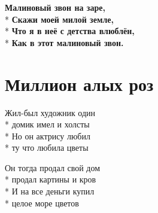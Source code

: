 \medskip

\begin{minipage}{\linewidth}
\hspace*{1.5em}\textbf{Малиновый звон на заре,}\\*
\hspace*{1.5em}\textbf{Скажи моей милой земле,}\\*
\hspace*{1.5em}\textbf{Что я в неё с детства влюблён,}\\*
\hspace*{1.5em}\textbf{Как в этот малиновый звон.}\\
\end{minipage}

\vspace{\fill}\newpage

\section{Миллион алых роз}
\label{song:Миллион_алых_роз}

\medskip

\begin{minipage}{\linewidth}
Жил-был художник один\\*
домик имел и холсты\\*
Но он актрису любил\\*
ту что любила цветы\\
\end{minipage}\par\medskip\nobreak

\medskip

\begin{minipage}{\linewidth}
Он тогда продал свой дом\\*
продал картины и кров\\*
И на все деньги купил\\*
целое море цветов\\
\end{minipage}\par\medskip\nobreak

\medskip

